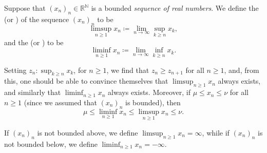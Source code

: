 \documentclass[notoc,notitlepage]{tufte-book}
\begin{document}
\begin{defn}\label{defn:limit_superior_and_limit_inferior}
  Suppose that $(x_n)_n \in \mathbb{R}^{\mathbb{N}}$ is a bounded
  \textit{sequence of real numbers}.
  We define the  (or )
  of the sequence $(x_n)_n$ to be
  \begin{equation*}
    \limsup_{n \geq 1} x_n \coloneqq \lim_{n \to \infty} \sup_{k \geq n} x_k,
  \end{equation*}
  and the  (or ) to be
  \begin{equation*}
    \liminf_{n \geq 1} x_n \coloneqq \lim_{n \to \infty} \inf_{k \geq n} x_k.
  \end{equation*}

  Setting $z_n : \sup_{k \geq n} x_k$, for $n \geq 1$,
  we find that $z_n \geq z_{n + 1}$ for all $n \geq 1$,
  and, from this, one should be able to convince themselves 
  that $\limsup_{n \geq 1} x_n$ always exists,
  and similarly that $\liminf_{n \geq 1} x_n$ always exists.
  Moreover, if $\mu \leq x_n \leq \nu$ for all $n \geq 1$
  (since we assumed that $(x_n)_n$ is bounded), then
  \begin{equation*}
    \mu \leq \liminf_{n \geq 1} x_n \leq \limsup_{n \geq 1} x_n \leq \nu.
  \end{equation*}

  If $(x_n)_n$ is not bounded above,
  we define $\limsup_{n \geq 1} x_n = \infty$,
  while if $(x_n)_n$ is not bounded below,
  we define $\liminf_{n \geq 1} x_n = -\infty$.
\end{defn}
\end{document}
